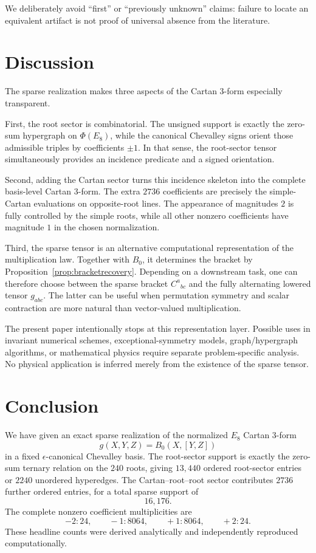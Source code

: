 \documentclass[11pt]{article}
\theoremstyle{definition}
\theoremstyle{remark}
\newcommand{\PhiE}{\Phi(E_8)}
\begin{document}
We deliberately avoid ``first'' or ``previously unknown'' claims: failure to locate an equivalent artifact is not proof of universal absence from the literature.

\section{Discussion}\label{sec:discussion}

The sparse realization makes three aspects of the Cartan 3-form especially transparent.

First, the root sector is combinatorial.  The unsigned support is exactly the zero-sum hypergraph on $\PhiE$, while the canonical Chevalley signs orient those admissible triples by coefficients $\pm1$.  In that sense, the root-sector tensor simultaneously provides an incidence predicate and a signed orientation.

Second, adding the Cartan sector turns this incidence skeleton into the complete basis-level Cartan 3-form.  The extra $2736$ coefficients are precisely the simple-Cartan evaluations on opposite-root lines.  The appearance of magnitudes $2$ is fully controlled by the simple roots, while all other nonzero coefficients have magnitude $1$ in the chosen normalization.

Third, the sparse tensor is an alternative computational representation of the multiplication law.  Together with $B_0$, it determines the bracket by Proposition~\ref{prop:bracketrecovery}.  Depending on a downstream task, one can therefore choose between the sparse bracket $C^a{}_{bc}$ and the fully alternating lowered tensor $g_{abc}$.  The latter can be useful when permutation symmetry and scalar contraction are more natural than vector-valued multiplication.

The present paper intentionally stops at this representation layer.  Possible uses in invariant numerical schemes, exceptional-symmetry models, graph/hypergraph algorithms, or mathematical physics require separate problem-specific analysis.  No physical application is inferred merely from the existence of the sparse tensor.

\section{Conclusion}

We have given an exact sparse realization of the normalized $E_8$ Cartan 3-form
\[
g(X,Y,Z)=B_0(X,[Y,Z])
\]
in a fixed $\epsilon$-canonical Chevalley basis.  The root-sector support is exactly the zero-sum ternary relation on the $240$ roots, giving $13{,}440$ ordered root-sector entries or $2240$ unordered hyperedges.  The Cartan--root--root sector contributes $2736$ further ordered entries, for a total sparse support of
\[
16{,}176.
\]
The complete nonzero coefficient multiplicities are
\[
-2:24,\qquad -1:8064,\qquad +1:8064,\qquad +2:24.
\]
These headline counts were derived analytically and independently reproduced computationally.
\end{document}
